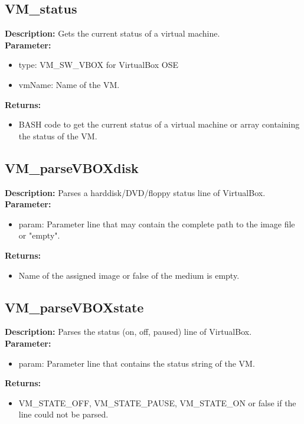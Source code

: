 \subsection{VM\_status}
\textbf{Description:} Gets the current status of a virtual machine.\\
\textbf{Parameter:}
\begin{itemize}
\item type: VM\_SW\_VBOX for VirtualBox OSE
\item vmName: Name of the VM.
\end{itemize}
\textbf{Returns:}
\begin{itemize}
\item BASH code to get the current status of a virtual machine or array containing the status of the VM.
\end{itemize}

\subsection{VM\_parseVBOXdisk}
\textbf{Description:} Parses a harddisk/DVD/floppy status line of VirtualBox.\\
\textbf{Parameter:}
\begin{itemize}
\item param: Parameter line that may contain the complete path to the image file or "empty".
\end{itemize}
\textbf{Returns:}
\begin{itemize}
\item Name of the assigned image or false of the medium is empty.
\end{itemize}

\subsection{VM\_parseVBOXstate}
\textbf{Description:} Parses the status (on, off, paused) line of VirtualBox.\\
\textbf{Parameter:}
\begin{itemize}
\item param: Parameter line that contains the status string of the VM.
\end{itemize}
\textbf{Returns:}
\begin{itemize}
\item VM\_STATE\_OFF, VM\_STATE\_PAUSE, VM\_STATE\_ON or false if the line could not be parsed.
\end{itemize}

